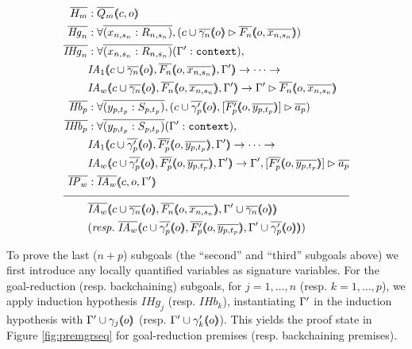 \begin{figure}
\begin{align*}
\ol{H_m} &: \ol{Q_m} \args{c , o} \\
\ol{\mathit{Hg}_n} &: \forall \ol{(x_{n,s_n} : R_{n,s_n})}, (\seqsl[c \cup \ol{\gamma_n} \args{o}]{\ol{F_n} \args{o , \ol{x_{n,s_n}}})} \\
\ol{\mathit{IHg}_n} &: \forall \ol{(x_{n,s_n} : R_{n,s_n})} (\inddyncon{} : \sltm{context}), \\
& \mathit{IA}_1 \args{c \cup \ol{\gamma_n} \args{o} , \ol{F_n} \args{o , \ol{x_{n,s_n}}} , \inddyncon{}} \rightarrow \dots \rightarrow \\
& \mathit{IA}_w \args{c \cup \ol{\gamma_n} \args{o} , \ol{F_n} \args{o , \ol{x_{n,s_n}}} , \inddyncon{}} \rightarrow \seqsl[\inddyncon{}]{\ol{F_n} \args{o , \ol{x_{n,s_n}}}} \\
\ol{\mathit{Hb}_p} &: \forall \ol{(y_{p,t_p} : S_{p,t_p})}, (\bchsl[c \cup \ol{\gamma'_p} \args{o}]{\ol{F'_p} \args{o , \ol{y_{p,t_p}}}}{\ol{a_p}}) \\
\ol{\mathit{IHb}_p} &: \forall \ol{(y_{p,t_p} : S_{p,t_p})} (\inddyncon{} : \sltm{context}), \\
& \mathit{IA}_1 \args{c \cup \ol{\gamma'_p} \args{o} , \ol{F'_p} \args{o , \ol{y_{p,t_p}}} , \inddyncon{}} \rightarrow \dots \rightarrow \\
& \mathit{IA}_w \args{c \cup \ol{\gamma'_p} \args{o} , \ol{F'_p} \args{o , \ol{y_{p,t_p}}} , \inddyncon{}} \rightarrow \bchsl[\inddyncon{}]{\ol{F'_p} \args{o , \ol{y_{p,t_p}}}}{\ol{a_p}} \\
\ol{\mathit{IP}_w} &: \ol{\mathit{IA}_w} \args{c , o , \inddyncon{}} \\[\pfshift{}]
\cline{1-2}
& \ol{\mathit{IA}_w} \args{c \cup \ol{\gamma_n} \args{o} , \ol{F_n} \args{o , \ol{x_{n,s_n}}} , \inddyncon{} \cup \ol{\gamma_n} \args{o}} \\
& (\mathit{resp.} \; \ol{\mathit{IA}_w} \args{c \cup \ol{\gamma'_p} \args{o} , \ol{F'_p} \args{o , \ol{y_{p,t_p}}} , \inddyncon{} \cup \ol{\gamma'_p} \args{o}})
\end{align*}
\end{figure}

To prove the last ($n + p$) subgoals (the ``second'' and ``third''
subgoals above) we first introduce any locally quantified variables as
signature variables. For the goal-reduction (resp. backchaining)
subgoals, for $j = 1 , \ldots , n$ (resp. $k = 1 , \ldots , p$), we
apply induction hypothesis $\mathit{IHg}_j$ (resp. $\mathit{IHb}_k$),
instantiating $\Gamma'{}$ in the induction hypothesis with
$\Gamma'{} \cup \gamma_j (\hspace{-0.35em} \langle o \rangle \hspace{-0.35em})$ (resp. $\Gamma'{} \cup
\gamma'_k (\hspace{-0.35em} \langle o \rangle \hspace{-0.35em})$). This yields the proof state in Figure
\ref{fig:premgrseq} for goal-reduction premises (resp. backchaining
premises).


